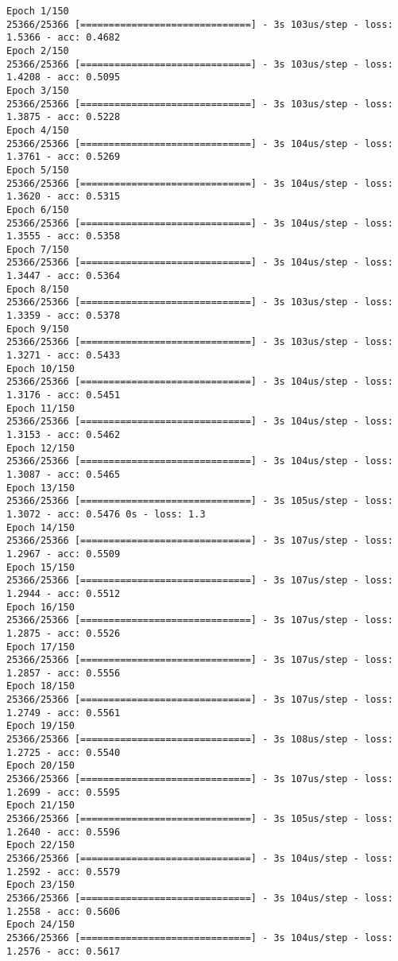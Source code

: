\documentclass[11pt]{article}
\begin{document}
    \begin{Verbatim}[commandchars=\\\{\}]
Epoch 1/150
25366/25366 [==============================] - 3s 103us/step - loss: 1.5366 - acc: 0.4682
Epoch 2/150
25366/25366 [==============================] - 3s 103us/step - loss: 1.4208 - acc: 0.5095
Epoch 3/150
25366/25366 [==============================] - 3s 103us/step - loss: 1.3875 - acc: 0.5228
Epoch 4/150
25366/25366 [==============================] - 3s 104us/step - loss: 1.3761 - acc: 0.5269
Epoch 5/150
25366/25366 [==============================] - 3s 104us/step - loss: 1.3620 - acc: 0.5315
Epoch 6/150
25366/25366 [==============================] - 3s 104us/step - loss: 1.3555 - acc: 0.5358
Epoch 7/150
25366/25366 [==============================] - 3s 104us/step - loss: 1.3447 - acc: 0.5364
Epoch 8/150
25366/25366 [==============================] - 3s 103us/step - loss: 1.3359 - acc: 0.5378
Epoch 9/150
25366/25366 [==============================] - 3s 103us/step - loss: 1.3271 - acc: 0.5433
Epoch 10/150
25366/25366 [==============================] - 3s 104us/step - loss: 1.3176 - acc: 0.5451
Epoch 11/150
25366/25366 [==============================] - 3s 104us/step - loss: 1.3153 - acc: 0.5462
Epoch 12/150
25366/25366 [==============================] - 3s 104us/step - loss: 1.3087 - acc: 0.5465
Epoch 13/150
25366/25366 [==============================] - 3s 105us/step - loss: 1.3072 - acc: 0.5476 0s - loss: 1.3
Epoch 14/150
25366/25366 [==============================] - 3s 107us/step - loss: 1.2967 - acc: 0.5509
Epoch 15/150
25366/25366 [==============================] - 3s 107us/step - loss: 1.2944 - acc: 0.5512
Epoch 16/150
25366/25366 [==============================] - 3s 107us/step - loss: 1.2875 - acc: 0.5526
Epoch 17/150
25366/25366 [==============================] - 3s 107us/step - loss: 1.2857 - acc: 0.5556
Epoch 18/150
25366/25366 [==============================] - 3s 107us/step - loss: 1.2749 - acc: 0.5561
Epoch 19/150
25366/25366 [==============================] - 3s 108us/step - loss: 1.2725 - acc: 0.5540
Epoch 20/150
25366/25366 [==============================] - 3s 107us/step - loss: 1.2699 - acc: 0.5595
Epoch 21/150
25366/25366 [==============================] - 3s 105us/step - loss: 1.2640 - acc: 0.5596
Epoch 22/150
25366/25366 [==============================] - 3s 104us/step - loss: 1.2592 - acc: 0.5579
Epoch 23/150
25366/25366 [==============================] - 3s 104us/step - loss: 1.2558 - acc: 0.5606
Epoch 24/150
25366/25366 [==============================] - 3s 104us/step - loss: 1.2576 - acc: 0.5617

\end{Verbatim}
\end{document}
